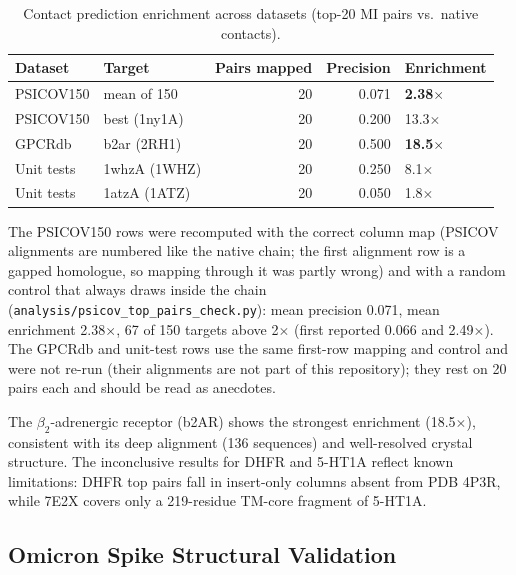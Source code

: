 \begin{table}[ht]
	\centering
	\caption{Contact prediction enrichment across datasets (top-20 MI pairs vs.\ native contacts).}
	\label{tab:cross-validation}
	\begin{tabular}{llrrl}
		\toprule
		Dataset    & Target       & Pairs mapped & Precision & Enrichment            \\
		\midrule
		PSICOV150  & mean of 150  & 20           & 0.071     & \textbf{2.38$\times$} \\
		PSICOV150  & best (1ny1A) & 20           & 0.200     & 13.3$\times$          \\
		GPCRdb     & b2ar (2RH1)  & 20           & 0.500     & \textbf{18.5$\times$} \\
		Unit tests & 1whzA (1WHZ) & 20           & 0.250     & 8.1$\times$           \\
		Unit tests & 1atzA (1ATZ) & 20           & 0.050     & 1.8$\times$           \\
		\bottomrule
	\end{tabular}
\end{table}

The PSICOV150 rows were recomputed with the correct column map (PSICOV
alignments are numbered like the native chain; the first alignment row is a
gapped homologue, so mapping through it was partly wrong) and with a random
control that always draws inside the chain (\texttt{analysis/psicov\_top\_pairs\_check.py}):
mean precision 0.071, mean enrichment 2.38$\times$, 67 of 150 targets above
2$\times$ (first reported 0.066 and 2.49$\times$).  The GPCRdb and unit-test rows
use the same first-row mapping and control and were not re-run (their
alignments are not part of this repository); they rest on 20 pairs each and
should be read as anecdotes.

The $\beta_2$-adrenergic receptor (b2AR) shows the strongest enrichment
(18.5$\times$), consistent with its deep alignment (136 sequences) and
well-resolved crystal structure.  The inconclusive results for DHFR and
5-HT1A reflect known limitations: DHFR top pairs fall in insert-only columns
absent from PDB 4P3R, while 7E2X covers only a 219-residue TM-core fragment
of 5-HT1A.

\subsection{Omicron Spike Structural Validation}

